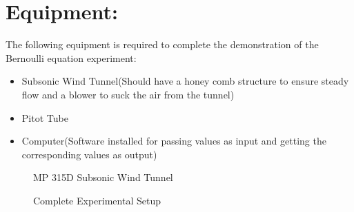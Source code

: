 \documentclass[12pt,a4paper]{article}
\begin{document}
\section{Equipment:}
The following equipment is required to complete the demonstration of the Bernoulli equation experiment:
\begin{itemize}
\item Subsonic Wind Tunnel(Should have a honey comb structure to ensure steady flow and a blower to suck the air from the tunnel)
\item Pitot Tube 
\item Computer(Software installed for passing values as input and getting the corresponding values as output)
\end{itemize}
\begin{figure}[!ht]
	\begin{center}
	\end{center}
	\caption{MP 315D Subsonic Wind Tunnel}
\end{figure}
\clearpage
\begin{figure}[!ht]
	\begin{center}
	\end{center}
	\caption{Complete Experimental Setup}
\end{figure}
\end{document}
